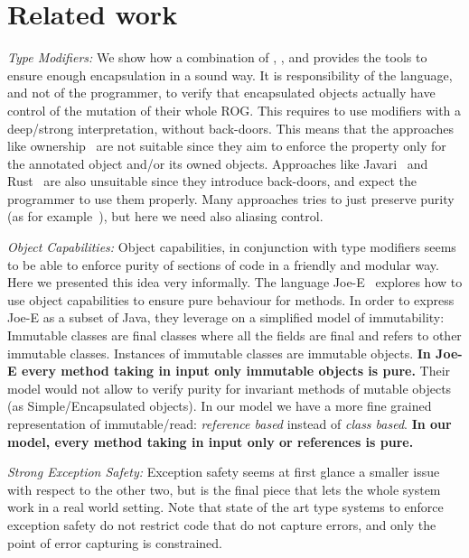 \section{Related work}
\label{s:related}
\saveSpace
\noindent\textit{Type Modifiers:}
We show how a combination of
\Q@mut@, \Q@imm@, \Q@read@ and \Q@capsule@ provides the tools to ensure enough encapsulation in a sound way. 
It is responsibility of the language, and not of the programmer,
to verify that encapsulated objects actually have control of the mutation of their whole ROG.
This requires to use modifiers with a deep/strong interpretation, without back-doors.
This means that the approaches like ownership~\cite{ClarkeEtAl13,ZibinEtAl10,DietlEtAl07}
are not suitable since they aim to enforce the property only for
the annotated object and/or its owned objects.
Approaches like Javari~\cite{TschantzErnst05,Boyland06} and Rust~\cite{matsakis2014rust}
are also unsuitable since they introduce back-doors, and expect the programmer to use them properly.
Many approaches tries to just preserve purity (as for example~\cite{pearce2011jpure}), but here we need also aliasing control.


\noindent
\textit{Object Capabilities:}
Object capabilities, in conjunction with type modifiers seems to be able to
 enforce purity of sections of code in a friendly and modular way.
Here we presented this idea very informally.
The language Joe-E~\cite{finifter2008verifiable}
explores how to use object capabilities to ensure
pure behaviour for methods.
In order to express Joe-E as a subset of Java,
they leverage on a simplified model of immutability:
Immutable classes are final classes where all the fields are final and refers to other immutable classes.
Instances of immutable classes are immutable objects.
\textbf{In Joe-E every method taking in input only immutable objects is pure.}
Their model would not allow to verify purity for invariant methods of mutable objects
 (as Simple/Encapsulated objects).
In our model we have a more fine grained representation of immutable/read:
 \emph{reference based} instead of \emph{class based}.
\textbf{
In our model, every method taking in input only \Q@read@ or \Q@imm@ references is pure.
}


\noindent\textit{Strong Exception Safety:}
Exception safety seems at first glance a smaller issue with respect 
to the other two, but is the final piece that lets the whole system work in a real world setting.
Note that state of the art type systems to enforce exception safety
 do not restrict code that do not capture errors, and
only the point of error capturing is constrained.


